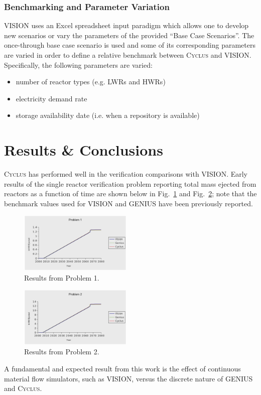 \documentclass{anstrans}
\begin{document}
\subsubsection{Benchmarking and Parameter Variation}
VISION uses an Excel spreadsheet input paradigm which allows one to
develop new scenarios or vary the parameters of the provided ``Base
Case Scenarios''. The once-through base case scenario is used and some
of its corresponding parameters are varied in order to define a
relative benchmark between \textsc{Cyclus} and VISION. Specifically, the
following parameters are varied:
\begin{itemize}
\item number of reactor types (e.g. LWRs and HWRs)
\item electricity demand rate
\item storage availability date (i.e. when a repository is available)
\end{itemize}

\section{Results \& Conclusions}
\textsc{Cyclus} has performed well in the verification comparisons with VISION.
Early results of the single reactor verification problem reporting total mass 
ejected from reactors as a function of time are shown below in Fig.~\ref{fig:p1} 
and Fig.~\ref{fig:p2}; note that the benchmark values 
used for VISION and GENIUS have been previously reported\cite{oliver2009}.
\begin{figure}[ht]
  \centering
  \includegraphics[width=0.48\textwidth]{p1.ps}
  \caption{Results from Problem 1.}
  \label{fig:p1}
\end{figure}
\begin{figure}[ht]
  \centering
  \includegraphics[width=0.48\textwidth]{p2.ps}
  \caption{Results from Problem 2.}
  \label{fig:p2}
\end{figure}
A fundamental and expected result from this work is the effect of continuous
material flow simulators, such as VISION, versus the discrete nature of 
GENIUS and \textsc{Cyclus}.
\end{document}
